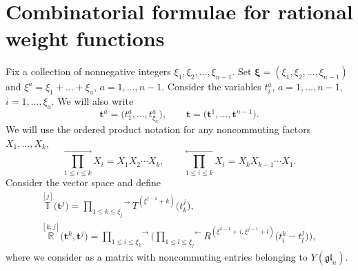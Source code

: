 \documentclass[10pt,a4paper]{amsart}
\numberwithin{equation}{section}
\begin{document}
\section{Combinatorial formulae for rational weight functions}

Fix a collection of nonnegative integers $\xi_1,\xi_2,\dots,\xi_{n-1}$. Set $\boldsymbol{\xi}=(\xi_1,\xi_2,\dots,\xi_{n-1})$ and $\xi^a=\xi_1+\dots+\xi_a$, $a=1,\dots,n-1$.
Consider the variables $t^a_i$, $a=1,\dots, n-1$, $i=1,\dots, \xi_a$. We will also write
\begin{equation*}
\boldsymbol{t}^a=\bigl(t^a_1,\dots, t^a_{\xi_a}\bigr),\qquad \boldsymbol{t}=\bigl(\boldsymbol{t}^1,\dots,\boldsymbol{t}^{n-1}\bigr).
\end{equation*}
We will use the ordered product notation for any noncommuting factors $X_1,\dots,X_k$,
\begin{equation*}
\overset{\rightarrow}{\prod\limits_{1\leq i\leq k}} X_i= X_1X_2\cdots X_k, \qquad \overset{\leftarrow}{\prod\limits_{1\leq i\leq k}} X_i= X_kX_{k-1}\cdots X_1.
\end{equation*}
Consider the vector space  and define
\begin{gather*}
\overset{[j]}{\mathbb{T}}\bigl({\boldsymbol{t}^j}\bigr)=\overset{\rightarrow}{\prod\limits_{ 1\leq k\leq \xi_j}} {T}^{(\xi^{j-1}+k)}\bigl(t_k^j\bigr),\\ \overset{[k,j]}{\mathbb{R}}\bigl(\boldsymbol{t}^k,\boldsymbol{t}^j\bigr)=
\overset{\rightarrow}{\prod\limits_{1\leq i\leq\xi_k}}\Biggl(
\overset{\leftarrow}{\prod\limits_{1\leq l\leq\xi_j}} {R}^{(\xi^{k-1}+i,\xi^{j-1}+l)}\bigl(t^k_i-t^j_l\bigr)\Biggr),
\end{gather*}
where we consider  as a matrix with noncommuting entries belonging to $Y(\mathfrak{gl}_{n})$.
\end{document}
